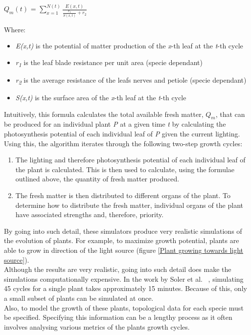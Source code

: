\begin{center}	
\textit{$Q_{m}(t)$} = $\sum_{x=1}^{N(t)} \frac{E(x,t)}{\frac{r_{1}}{S(x,t)} + r_{2}} $
\end{center}
Where:
\begin{itemize}
\item \textit{E(x,t)} is the potential of matter production of the \textit{x}-th leaf at the \textit{t}-th cycle
\item \textit{r\textsubscript{1}} is the leaf blade resistance per unit area (specie dependant)
\item \textit{r\textsubscript{2}} is the average resistance of the leafs nerves and petiole (specie dependant)
\item \textit{S(x,t)} is the surface area of the \textit{x}-th leaf at the \textit{t}-th cycle
\end{itemize}
Intuitively, this formula calculates the total available fresh matter, \textit{$Q_{m}$}, that can be produced for an individual plant \textit{P} at a given time \textit{t} by calculating the photosynthesis potential of each individual leaf of \textit{P} given the current lighting.\\

Using this, the algorithm iterates through the following two-step growth cycles:
\begin{enumerate}
\item The lighting and therefore photosynthesis potential of each individual leaf of the plant is calculated. This is then used to calculate, using the formulae outlined above, the quantity of fresh matter produced.
\item The fresh matter is then distributed to different organs of the plant. To determine how to distribute the fresh matter, individual organs of the plant have associated strengths and, therefore, priority.
\end{enumerate}

By going into such detail, these simulators produce very realistic simulations of the evolution of plants. For example, to maximize growth potential, plants are able to grow in direction of the light source (figure \ref{Plant growing towards light source}).\\

Although the results are very realistic, going into such detail does make the simulations computationally expensive. In the work by Soler et al. ~\cite{Soler2001}, simulating 45 cycles for a single plant takes approximately 15 minutes. Because of this, only a small subset of plants can be simulated at once. \\
Also, to model the growth of these plants, topological data for each specie must be specified. Specifying this information can be a lengthy process as it often involves analysing various metrics of the plants growth cycles.

